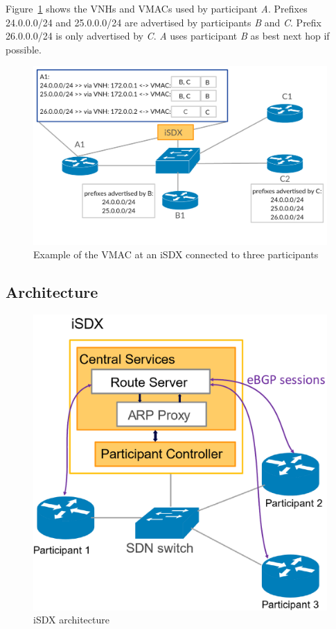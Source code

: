 Figure~\ref{fig:isdx_vmac} shows the VNHs and VMACs used by participant \emph{A}. Prefixes 24.0.0.0/24 and 25.0.0.0/24 are advertised by participants \emph{B} and \emph{C}. Prefix 26.0.0.0/24 is only advertised by \emph{C}. \emph{A} uses participant \emph{B} as best next hop if possible. 

\begin{figure}[h]
\center
\includegraphics[scale = 0.33]{Figures/sdx_vmac3.pdf}
\caption{Example of the VMAC at an iSDX connected to three participants}
\label{fig:isdx_vmac}
\end{figure}


\subsection{\label{chapter2:iSDX:iSDX_architecture}Architecture}
\begin{figure}[h]
\center
\includegraphics[scale = 0.3]{Figures/isdx_architectur_cropped.pdf}
\caption{iSDX architecture}
\end{figure}

